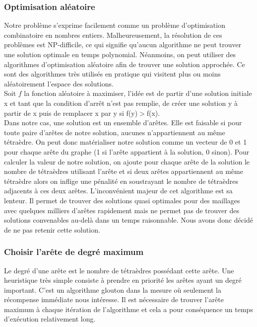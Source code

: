 \subsubsection{Optimisation aléatoire}
\noindent
Notre problème s'exprime facilement comme un problème d'optimisation combinatoire en nombres entiers. Malheureusement, la résolution de ces problèmes est NP-difficile, ce qui signifie qu'aucun algorithme ne peut trouver une solution optimale en temps polynomial. Néanmoins, on peut utiliser des algorithmes d'optimisation aléatoire afin de trouver une solution approchée. Ce sont des algorithmes très utilisés en pratique qui visitent plus ou moins aléatoirement l'espace des solutions.\\
Soit $f$ la fonction aléatoire à maximiser, l'idée est de partir d'une solution initiale x et tant que la condition d'arrêt n'est pas remplie, de créer une solution y à partir de x puis de remplacer x par y si f(y)$>$f(x).\\
Dans notre cas, une solution est un ensemble d'arêtes. Elle est faisable si pour toute paire d'arêtes de notre solution, aucunes n'appartiennent au même tétraèdre. On peut donc matérialiser notre solution comme un vecteur de 0 et 1 pour chaque arête du graphe (1 si l'arête appartient à la solution, 0 sinon). Pour calculer la valeur de notre solution, on ajoute pour chaque arête de la solution le nombre de tétraèdres utilisant l'arête et si deux arêtes appartiennent au même tétraèdre alors on inflige une pénalité en soustrayant le nombre de tétraèdres adjacents à ces deux arêtes. L'inconvénient majeur de cet algorithme est sa lenteur. Il permet de trouver des solutions quasi optimales pour des maillages avec quelques milliers d'arêtes rapidement mais ne permet pas de trouver des solutions convenables au-delà dans un temps raisonnable. Nous avons donc décidé de ne pas retenir cette solution.

\subsubsection{Choisir l'arête de degré maximum}
\noindent
Le degré d'une arête est le nombre de tétraèdres possédant cette arête. Une heuristique très simple consiste à prendre en priorité les arêtes ayant un degré important. C'est un algorithme glouton dans la mesure où seulement la récompense immédiate nous intéresse. Il est nécessaire de trouver l'arête maximum à chaque itération de l'algorithme et cela a pour conséquence un temps d'exécution relativement long.
